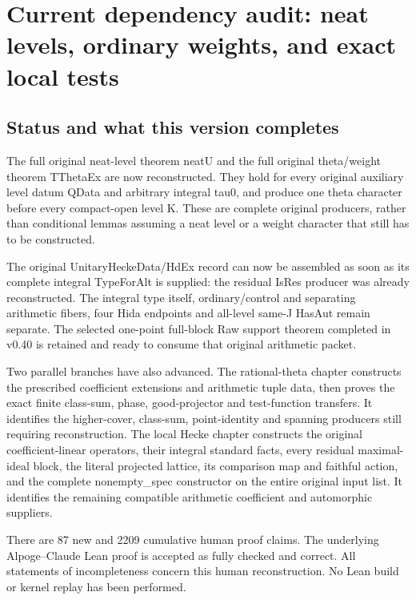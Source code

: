 \section{Current dependency audit: neat levels, ordinary weights, and exact local tests}

\label{sec:dependency-audit-v41}

\subsection{Status and what this version completes}

The full original neat-level theorem neatU and the full original theta/\allowbreak{}weight theorem TThetaEx are now reconstructed. They hold for every original auxiliary level datum QData and arbitrary integral tau0, and produce one theta character before every compact-open level K. These are complete original producers, rather than conditional lemmas assuming a neat level or a weight character that still has to be constructed.

The original UnitaryHeckeData/\allowbreak{}HdEx record can now be assembled as soon as its complete integral TypeForAlt is supplied: the residual IsRes producer was already reconstructed. The integral type itself, ordinary/\allowbreak{}control and separating arithmetic fibers, four Hida endpoints and all-level same-J HasAut remain separate. The selected one-point full-block Raw support theorem completed in v0.40 is retained and ready to consume that original arithmetic packet.

Two parallel branches have also advanced. The rational-theta chapter constructs the prescribed coefficient extensions and arithmetic tuple data, then proves the exact finite class-sum, phase, good-projector and test-function transfers. It identifies the higher-cover, class-sum, point-identity and spanning producers still requiring reconstruction. The local Hecke chapter constructs the original coefficient-linear operators, their integral standard facts, every residual maximal-ideal block, the literal projected lattice, its comparison map and faithful action, and the complete nonempty\_\allowbreak{}spec constructor on the entire original input list. It identifies the remaining compatible arithmetic coefficient and automorphic suppliers.

There are 87 new and 2209 cumulative human proof claims. The underlying Alpoge–Claude Lean proof is accepted as fully checked and correct. All statements of incompleteness concern this human reconstruction. No Lean build or kernel replay has been performed.

